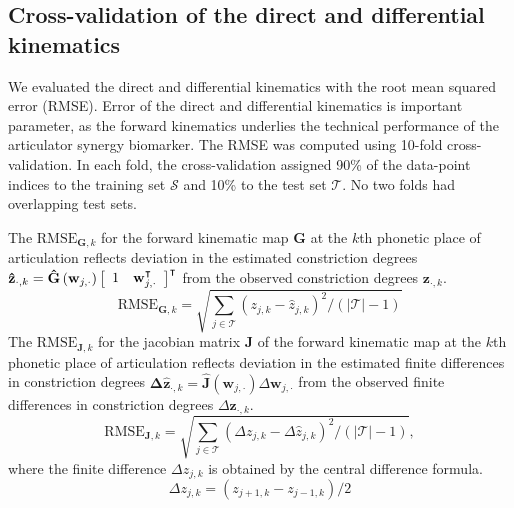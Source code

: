 \documentclass[preprint]{JASAnew}\usepackage[]{graphicx}\usepackage[]{color}
\begin{document}
\subsection{Cross-validation of the direct and differential kinematics}
\label{subsec:crossval}

We evaluated the direct and differential kinematics with the root mean squared error (RMSE).
%
Error of the direct and differential kinematics is important parameter, as the forward kinematics underlies the technical performance of the articulator synergy biomarker.
%
The RMSE was computed using \num{10}-fold cross-validation. 
%
In each fold, the cross-validation assigned 90\% of the data-point indices to the training set $\mathcal{S}$ and 10\% to the test set $\mathcal{T}$.
%
No two folds had overlapping test sets. 


The $\mathrm{RMSE}_{\mathbf{G},k}$ for the forward kinematic map $\mathbf{G}$ at the $k$th phonetic place of articulation reflects deviation in the estimated constriction degrees $\mathbf{\hat{z}}_{\cdot,k} = \mathbf{\hat{G}}\left( \mathbf{w}_{j,\cdot} \right) \left[ \begin{array}{c c} 1 & \mathbf{w}_{j,\cdot}^\intercal \end{array} \right]^\intercal$ from the observed constriction degrees $\mathbf{z}_{\cdot,k}$.
%
\begin{equation}
\mathrm{RMSE}_{\mathbf{G},k} = \sqrt{ \sum_{j\in\mathcal{T}} \left( z_{j,k} - \hat{z}_{j,k} \right)^2 \bigg/ \left( \lvert \mathcal{T} \rvert - 1 \right) }
\end{equation}
The $\mathrm{RMSE}_{\mathbf{J},k}$ for the jacobian matrix $\mathbf{J}$ of the forward kinematic map at the $k$th phonetic place of articulation reflects deviation in the estimated finite differences in constriction degrees $\mathbf{\Delta \hat{z}}_{\cdot,k} = \mathbf{\hat{J}}\left( \mathbf{w}_{j,\cdot} \right) \Delta \mathbf{w}_{j,\cdot}$ from the observed finite differences in constriction degrees $\Delta \mathbf{z}_{\cdot,k}$.
%
\begin{equation}
\mathrm{RMSE}_{\mathbf{J},k} = \sqrt{ \sum_{j\in\mathcal{T}} \left( \Delta z_{j,k} - \Delta \hat{z}_{j,k} \right)^2 \bigg/ \left( \lvert \mathcal{T} \rvert - 1 \right) },
\end{equation}
%
where the finite difference $\Delta z_{j,k}$ is obtained by the central difference formula.
%
\begin{equation}
\Delta z_{j,k} = \left( z_{j+1,k} - z_{j-1,k} \right) / 2
\end{equation}
\end{document}
